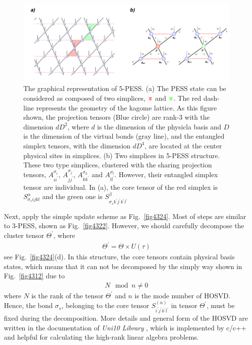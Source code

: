 \begin{figure}[ht]
	\centering
	\includegraphics[width=1.00\textwidth]{figures/fig4323.png}
	\caption[The graphical representation of 5-PESS]{The graphical representation of 5-PESS. (a) The PESS state can be considered as composed of two simplices, $\rjoinr$ and $\rjoing$. The red dash-line represents the geometry of the kagome lattice. As this figure shown, the projection tensors (Blue circle) are rank-3 with the dimension $dD^2$, where $d$ is the dimension of the physicla basis and $D$ is the dimension of the virtual bonds (gray line), and the entangled simplex tensors, with the dimension $dD^4$, are located at the center physical sites in simplices. (b) Two simplices in 5-PESS structure. These two type simplices, clustered with the sharing projection tensors, $A^{\sigma_i}_{ii^{\prime}}$, $A^{\sigma_j}_{jj^{\prime}}$, $A^{\sigma_k}_{kk^{\prime}}$ and $A^{\sigma_l}_{ll^{\prime}}$. However, their entangled simplex tensor are individual. In (a), the core tensor of the red simplex is $S^{\alpha}_{\sigma_s ijkl}$ and the green one is $S^{\beta}_{\sigma_s k^{\prime}j^{\prime}k^{\prime}l^{\prime}}$}
	\label{fig4323}
\end{figure}
Next, apply the simple update scheme as Fig.~\ref{fig4324}. Most of steps are similar to 3-PESS, shown as Fig.~\ref{fig4322}. However, we should carefully decompose the cluster tensor $\Theta^{\prime}$, where
\begin{align}
	\Theta^{\prime} = \Theta \times U(\tau)
\end{align}
see Fig.~\ref{fig4324}(d). In this structure, the core tensors contain physical basis states, which means that it can not be decomposed by the simply way shown in Fig.~\ref{fig4312} due to
\begin{align}
	N \mod n \neq 0
\end{align}
where $N$ is the rank of the tensor $\Theta^{\prime}$ and $n$ is the mode number of HOSVD. Hence, the bond $\sigma_s$, belonging to the core tensor $S^{(\alpha)}_{i^{\prime}j^{\prime}k^{\prime}l^{\prime}}$ in tensor $\Theta^{\prime}$, must be fixed during the decomposition. More details and general form of the HOSVD are written in the documentation of \textit{Uni10 Library} \cite{}, which is implemented by c/c++ and helpful for calculating the high-rank linear algebra problems.
